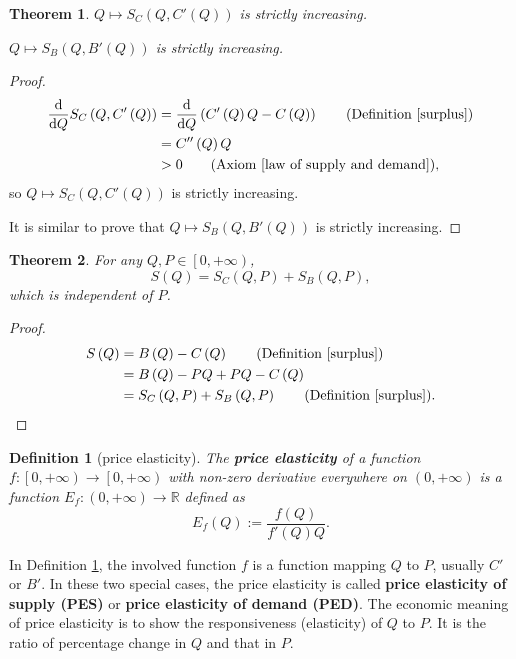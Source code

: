 \documentclass{article}
\newtheorem{theorem}{Theorem}
\newtheorem{definition}{Definition}
\begin{document}
\begin{theorem}
$Q\mapsto S_C\left(Q,C'\left(Q\right)\right)$ is strictly increasing.

$Q\mapsto S_B\left(Q,B'\left(Q\right)\right)$ is strictly increasing.
\end{theorem}
\begin{proof}
\begin{align*}
\frac{\mathrm d}{\mathrm dQ}S_C\left(Q,C'\left(Q\right)\right)&=\frac{\mathrm d}{\mathrm dQ}\left(C'\left(Q\right)Q-C\left(Q\right)\right)\qquad\text{(Definition \ref{surplus})}\\
&=C''\left(Q\right)Q\\
&>0\qquad\text{(Axiom \ref{law of supply and demand})},
\end{align*}
so $Q\mapsto S_C\left(Q,C'\left(Q\right)\right)$ is strictly increasing.

It is similar to prove that $Q\mapsto S_B\left(Q,B'\left(Q\right)\right)$ is strictly increasing.
\end{proof}

\begin{theorem}
For any $Q,P\in\left[0,+\infty\right)$,
$$S\left(Q\right)=S_C\left(Q,P\right)+S_B\left(Q,P\right),$$
which is independent of $P$.
\end{theorem}
\begin{proof}
\begin{align*}
S\left(Q\right)&=B\left(Q\right)-C\left(Q\right)\qquad\text{(Definition \ref{surplus})}\\
&=B\left(Q\right)-PQ+PQ-C\left(Q\right)\\
&=S_C\left(Q,P\right)+S_B\left(Q,P\right)\qquad\text{(Definition \ref{surplus})}.
\end{align*}
\end{proof}

\begin{definition}[price elasticity]
\label{price elasticity}
The \textbf{price elasticity} of a function $f:\left[0,+\infty\right)\to\left[0,+\infty\right)$ with non-zero derivative everywhere on $\left(0,+\infty\right)$
is a function $E_f:\left(0,+\infty\right)\to\mathbb R$ defined as
$$E_f\left(Q\right):=\frac{f\left(Q\right)}{f'\left(Q\right)Q}.$$
\end{definition}

In Definition \ref{price elasticity}, the involved function $f$ is a function mapping $Q$ to $P$, usually $C'$ or $B'$.
In these two special cases, the price elasticity is called \textbf{price elasticity of supply (PES)} or \textbf{price elasticity of demand (PED)}.
The economic meaning of price elasticity is to show the responsiveness (elasticity) of $Q$ to $P$.
It is the ratio of percentage change in $Q$ and that in $P$.
\end{document}
